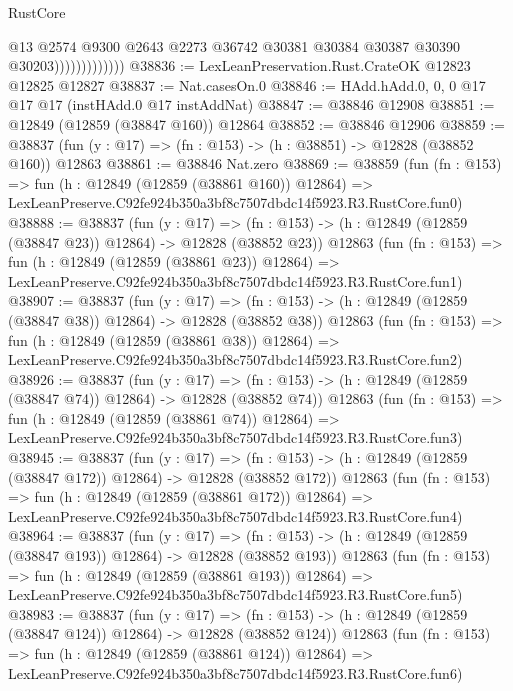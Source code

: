 \begin{lexlean}{RustCore}
\begin{coremodule}
                              @13
                              @2574
                              @9300
                              @2643
                              @2273
                              @36742
                              @30381
                              @30384
                              @30387
                              @30390
                              @30203)))))))))))))
@38836 := LexLeanPreservation.Rust.CrateOK @12823 @12825 @12827
@38837 := Nat.casesOn.{0}
@38846 := HAdd.hAdd.{0, 0, 0} @17 @17 @17 (instHAdd.{0} @17 instAddNat)
@38847 := @38846 @12908
@38851 := @12849 (@12859 (@38847 @160)) @12864
@38852 := @38846 @12906
@38859 := @38837 (fun (y : @17) => (fn : @153) -> (h : @38851) -> @12828 (@38852 @160)) @12863
@38861 := @38846 Nat.zero
@38869 := @38859
    (fun (fn : @153) =>
    fun (h : @12849 (@12859 (@38861 @160)) @12864) =>
    LexLeanPreserve.C92fe924b350a3bf8c7507dbdc14f5923.R3.RustCore.fun0)
@38888 := @38837
    (fun (y : @17) =>
    (fn : @153) -> (h : @12849 (@12859 (@38847 @23)) @12864) -> @12828 (@38852 @23))
    @12863
    (fun (fn : @153) =>
    fun (h : @12849 (@12859 (@38861 @23)) @12864) =>
    LexLeanPreserve.C92fe924b350a3bf8c7507dbdc14f5923.R3.RustCore.fun1)
@38907 := @38837
    (fun (y : @17) =>
    (fn : @153) -> (h : @12849 (@12859 (@38847 @38)) @12864) -> @12828 (@38852 @38))
    @12863
    (fun (fn : @153) =>
    fun (h : @12849 (@12859 (@38861 @38)) @12864) =>
    LexLeanPreserve.C92fe924b350a3bf8c7507dbdc14f5923.R3.RustCore.fun2)
@38926 := @38837
    (fun (y : @17) =>
    (fn : @153) -> (h : @12849 (@12859 (@38847 @74)) @12864) -> @12828 (@38852 @74))
    @12863
    (fun (fn : @153) =>
    fun (h : @12849 (@12859 (@38861 @74)) @12864) =>
    LexLeanPreserve.C92fe924b350a3bf8c7507dbdc14f5923.R3.RustCore.fun3)
@38945 := @38837
    (fun (y : @17) =>
    (fn : @153) -> (h : @12849 (@12859 (@38847 @172)) @12864) -> @12828 (@38852 @172))
    @12863
    (fun (fn : @153) =>
    fun (h : @12849 (@12859 (@38861 @172)) @12864) =>
    LexLeanPreserve.C92fe924b350a3bf8c7507dbdc14f5923.R3.RustCore.fun4)
@38964 := @38837
    (fun (y : @17) =>
    (fn : @153) -> (h : @12849 (@12859 (@38847 @193)) @12864) -> @12828 (@38852 @193))
    @12863
    (fun (fn : @153) =>
    fun (h : @12849 (@12859 (@38861 @193)) @12864) =>
    LexLeanPreserve.C92fe924b350a3bf8c7507dbdc14f5923.R3.RustCore.fun5)
@38983 := @38837
    (fun (y : @17) =>
    (fn : @153) -> (h : @12849 (@12859 (@38847 @124)) @12864) -> @12828 (@38852 @124))
    @12863
    (fun (fn : @153) =>
    fun (h : @12849 (@12859 (@38861 @124)) @12864) =>
    LexLeanPreserve.C92fe924b350a3bf8c7507dbdc14f5923.R3.RustCore.fun6)

\end{coremodule}
\end{lexlean}
